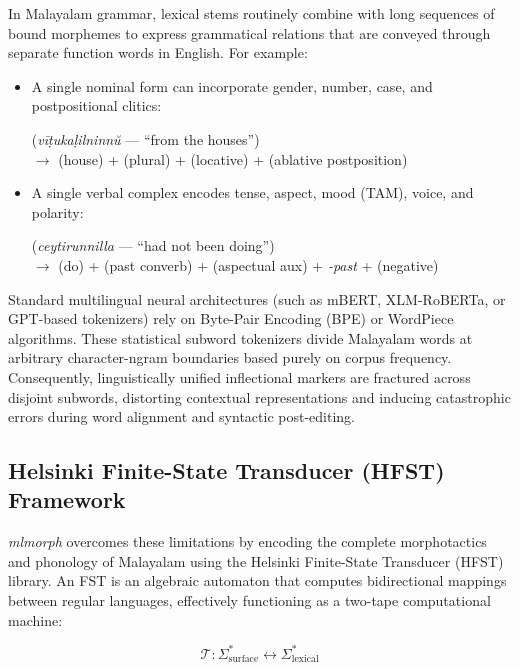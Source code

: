 In Malayalam grammar, lexical stems routinely combine with long sequences of bound morphemes to express grammatical relations that are conveyed through separate function words in English. For example:
\begin{itemize}[noitemsep]
    \item A single nominal form can incorporate gender, number, case, and postpositional clitics:
    \begin{center}
     (\textit{vīṭukaḷilninnŭ} — ``from the houses'')\\
    $\longrightarrow$  (house) +  (plural) +  (locative) +  (ablative postposition)
    \end{center}
    \item A single verbal complex encodes tense, aspect, mood (TAM), voice, and polarity:
    \begin{center}
     (\textit{ceytirunnilla} — ``had not been doing'')\\
    $\longrightarrow$  (do) +  (past converb) +  (aspectual aux) + \textit{-past} +  (negative)
    \end{center}
\end{itemize}

Standard multilingual neural architectures (such as mBERT, XLM-RoBERTa, or GPT-based tokenizers) rely on Byte-Pair Encoding (BPE) or WordPiece algorithms. These statistical subword tokenizers divide Malayalam words at arbitrary character-ngram boundaries based purely on corpus frequency. Consequently, linguistically unified inflectional markers are fractured across disjoint subwords, distorting contextual representations and inducing catastrophic errors during word alignment and syntactic post-editing.

\subsection{Helsinki Finite-State Transducer (HFST) Framework}

\textit{mlmorph} \citep{thottingal2019finite} overcomes these limitations by encoding the complete morphotactics and phonology of Malayalam using the Helsinki Finite-State Transducer (HFST) library. An FST is an algebraic automaton that computes bidirectional mappings between regular languages, effectively functioning as a two-tape computational machine:

\begin{equation}
    \mathcal{T}: \Sigma_{\text{surface}}^* \longleftrightarrow \Sigma_{\text{lexical}}^*
\end{equation}

